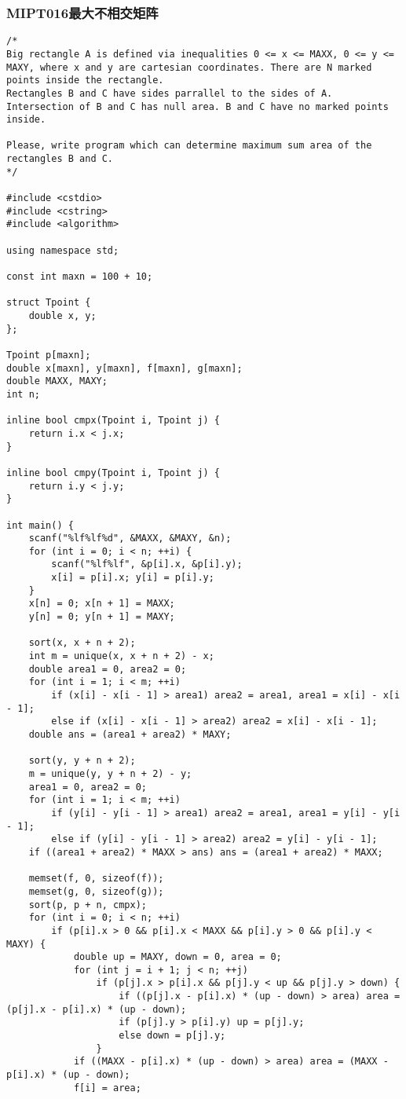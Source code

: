 \subsubsection{MIPT016最大不相交矩阵}
\begin{verbatim}
/*
Big rectangle A is defined via inequalities 0 <= x <= MAXX, 0 <= y <= MAXY, where x and y are cartesian coordinates. There are N marked points inside the rectangle.
Rectangles B and C have sides parrallel to the sides of A. Intersection of B and C has null area. B and C have no marked points inside.

Please, write program which can determine maximum sum area of the rectangles B and C.
*/

#include <cstdio>
#include <cstring>
#include <algorithm>

using namespace std;

const int maxn = 100 + 10;

struct Tpoint {
	double x, y;
};

Tpoint p[maxn];
double x[maxn], y[maxn], f[maxn], g[maxn];
double MAXX, MAXY;
int n;

inline bool cmpx(Tpoint i, Tpoint j) {
	return i.x < j.x;
}

inline bool cmpy(Tpoint i, Tpoint j) {
	return i.y < j.y;
}

int main() {
	scanf("%lf%lf%d", &MAXX, &MAXY, &n);
	for (int i = 0; i < n; ++i) {
		scanf("%lf%lf", &p[i].x, &p[i].y);
		x[i] = p[i].x; y[i] = p[i].y;
	}
	x[n] = 0; x[n + 1] = MAXX;
	y[n] = 0; y[n + 1] = MAXY;

	sort(x, x + n + 2);
	int m = unique(x, x + n + 2) - x;
	double area1 = 0, area2 = 0;
	for (int i = 1; i < m; ++i)
		if (x[i] - x[i - 1] > area1) area2 = area1, area1 = x[i] - x[i - 1];
		else if (x[i] - x[i - 1] > area2) area2 = x[i] - x[i - 1];
	double ans = (area1 + area2) * MAXY;

	sort(y, y + n + 2);
	m = unique(y, y + n + 2) - y;
	area1 = 0, area2 = 0;
	for (int i = 1; i < m; ++i)
		if (y[i] - y[i - 1] > area1) area2 = area1, area1 = y[i] - y[i - 1];
		else if (y[i] - y[i - 1] > area2) area2 = y[i] - y[i - 1];
	if ((area1 + area2) * MAXX > ans) ans = (area1 + area2) * MAXX;

	memset(f, 0, sizeof(f));
	memset(g, 0, sizeof(g));
	sort(p, p + n, cmpx);
	for (int i = 0; i < n; ++i)
		if (p[i].x > 0 && p[i].x < MAXX && p[i].y > 0 && p[i].y < MAXY) {
			double up = MAXY, down = 0, area = 0;
			for (int j = i + 1; j < n; ++j)
				if (p[j].x > p[i].x && p[j].y < up && p[j].y > down) {
					if ((p[j].x - p[i].x) * (up - down) > area) area = (p[j].x - p[i].x) * (up - down);
					if (p[j].y > p[i].y) up = p[j].y;
					else down = p[j].y;
				}
			if ((MAXX - p[i].x) * (up - down) > area) area = (MAXX - p[i].x) * (up - down);
			f[i] = area;


\end{verbatim}
